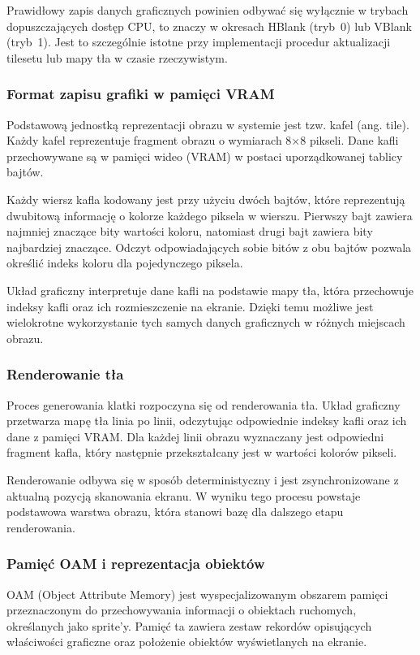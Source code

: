 \documentclass{article}
\begin{document}
Prawidłowy zapis danych graficznych powinien odbywać się wyłącznie w trybach
dopuszczających dostęp CPU, to znaczy w okresach HBlank (tryb~0) lub VBlank
(tryb~1). Jest to szczególnie istotne przy implementacji procedur aktualizacji
tilesetu lub mapy tła w czasie rzeczywistym.

\subsubsection{Format zapisu grafiki w pamięci VRAM}

Podstawową jednostką reprezentacji obrazu w systemie jest tzw. kafel (ang. tile). Każdy kafel reprezentuje fragment obrazu o wymiarach 8×8 pikseli. Dane kafli przechowywane są w pamięci wideo (VRAM) w postaci uporządkowanej tablicy bajtów.

Każdy wiersz kafla kodowany jest przy użyciu dwóch bajtów, które reprezentują dwubitową informację o kolorze każdego piksela w wierszu. Pierwszy bajt zawiera najmniej znaczące bity wartości koloru, natomiast drugi bajt zawiera bity najbardziej znaczące. Odczyt odpowiadających sobie bitów z obu bajtów pozwala określić indeks koloru dla pojedynczego piksela.

Układ graficzny interpretuje dane kafli na podstawie mapy tła, która przechowuje indeksy kafli oraz ich rozmieszczenie na ekranie. Dzięki temu możliwe jest wielokrotne wykorzystanie tych samych danych graficznych w różnych miejscach obrazu.

\subsubsection{Renderowanie tła}

Proces generowania klatki rozpoczyna się od renderowania tła. Układ graficzny przetwarza mapę tła linia po linii, odczytując odpowiednie indeksy kafli oraz ich dane z pamięci VRAM. Dla każdej linii obrazu wyznaczany jest odpowiedni fragment kafla, który następnie przekształcany jest w wartości kolorów pikseli.

Renderowanie odbywa się w sposób deterministyczny i jest zsynchronizowane z aktualną pozycją skanowania ekranu. W wyniku tego procesu powstaje podstawowa warstwa obrazu, która stanowi bazę dla dalszego etapu renderowania.

\subsubsection{Pamięć OAM i reprezentacja obiektów}
\label{oam}
OAM (Object Attribute Memory) jest wyspecjalizowanym obszarem pamięci przeznaczonym do przechowywania informacji o obiektach ruchomych, określanych jako sprite'y. Pamięć ta zawiera zestaw rekordów opisujących właściwości graficzne oraz położenie obiektów wyświetlanych na ekranie.
\end{document}
